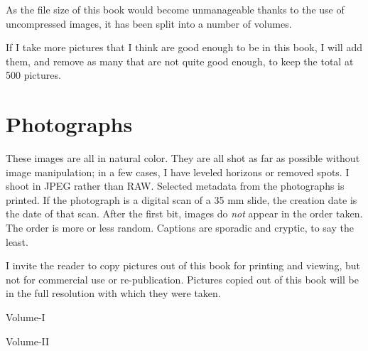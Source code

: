 \documentclass[11pt,chapterprefix=true,pagesize=letter]{scrbook}
\begin{document}
As the file size of this book would become unmanageable thanks to the use of uncompressed images, it has been split into a number of volumes.

If I take more pictures that I think are good enough to be in this book, I will add them, and remove as many that are not quite good enough, to keep the total at 500 pictures.

\chapter{Photographs}

These images are all in natural color. They are all shot as far as possible without image manipulation; in a few cases, I have leveled horizons or removed spots. I shoot in JPEG rather than RAW. Selected metadata from the photographs is printed. If the photograph is a digital scan of a 35 mm slide, the creation date is the date of that scan. After the first bit, images do \emph{not} appear in the order taken. The order is more or less random. Captions are sporadic and cryptic, to say the least.

I invite the reader to copy pictures out of this book for printing and viewing, but not for commercial use or re-publication. Pictures copied out of this book will be in the full resolution with which they were taken.

 {Volume-I}

 {Volume-II}
\end{document}
